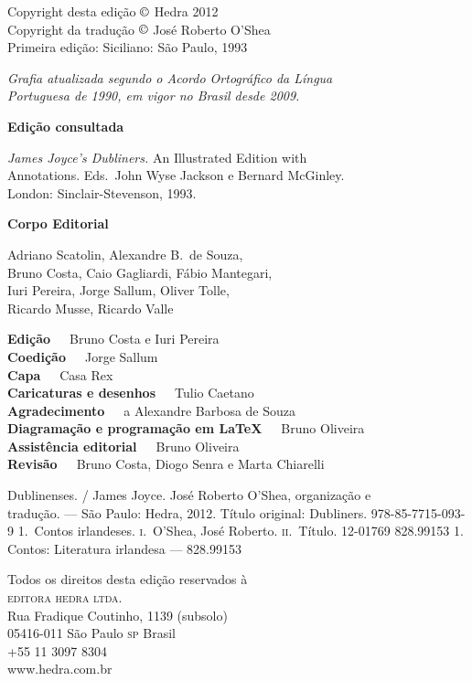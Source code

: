
\begingroup
\parindent0mm\parskip0mm
\footnotesize
\thispagestyle{empty}

Copyright desta edição $\copyright$ Hedra 2012\\
Copyright da tradução $\copyright$ José Roberto O'Shea\\
Primeira edição: Siciliano: São Paulo, 1993\medskip

{\itshape
Grafia atualizada segundo o Acordo Ortográfico da Língua\\
Portuguesa de 1990, em vigor no Brasil desde 2009. 
}\medskip

\textbf{Edição consultada}

\textit{James Joyce’s Dubliners.} An Illustrated Edition with\\
Annotations. Eds.~John Wyse Jackson e Bernard McGinley.\\
London: Sinclair-Stevenson, 1993.\smallskip

\textbf{Corpo Editorial}

Adriano Scatolin,
Alexandre B.~de Souza,\\
Bruno Costa,
Caio Gagliardi,
Fábio Mantegari,\\
Iuri Pereira,
Jorge Sallum,
Oliver Tolle,\\
Ricardo Musse,
Ricardo Valle\smallskip

\textbf{Edição}\ \ \  Bruno Costa e Iuri Pereira\\
\textbf{Coedição}\ \ \  Jorge Sallum\\
\textbf{Capa}\ \ \  Casa Rex\\
\textbf{Caricaturas e desenhos}\ \ \ Tulio Caetano\\
\textbf{Agradecimento}\ \ \ a Alexandre Barbosa de Souza\\
\textbf{Diagramação e programação em \LaTeX}\ \ \  Bruno Oliveira\\
\textbf{Assistência editorial}\ \ \  Bruno Oliveira\\
\textbf{Revisão}\ \ \ Bruno Costa, Diogo Senra e Marta Chiarelli

{Dublinenses. / James Joyce. José Roberto O'Shea, organização e\\ tradução. --- São Paulo: Hedra, 2012.}
{Título original: Dubliners.}
{978-85-7715-093-9}
{1.~Contos irlandeses. \textsc{i}.~O'Shea, José Roberto.  \textsc{ii}.~Título.}
{12-01769} {828.99153} {1. Contos: Literatura irlandesa --- 828.99153}

Todos os direitos desta edição reservados à\\
\textsc{editora hedra ltda.}\\
Rua Fradique Coutinho, 1139 (subsolo)\\
05416-011 São Paulo \textsc{sp} Brasil\\
+55 11 3097 8304\\
www.hedra.com.br
\endgroup

\clearpage 

